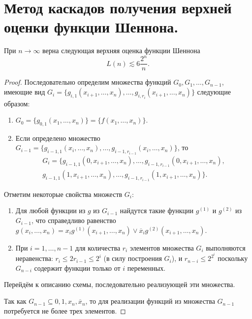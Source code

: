 \section{Метод каскадов получения верхней оценки функции Шеннона.}

\begin{theorem}
    При $n \to \infty$ верна следующая верхняя оценка функции Шеннона
    \[
        L(n) \lesssim 6 \frac{2^n}{n}.
    \]
\end{theorem}

\begin{proof}
    Последовательно определим множества функций $G_0, G_1, \ldots, G_{n-1}$, имеющие вид $G_i = \{g_{i,1}(x_{i+1}, \ldots, x_n), \ldots, g_{i,r_i}(x_{i+1}, \ldots, x_n)\}$ следующие образом:
    \begin{enumerate}[nolistsep]
        \item $G_0 = \{g_{0,1} (x_1, \ldots, x_n)\} = \{f(x_1, \ldots, x_n)\}$.
        \item Если определено множество $G_{i-1} = \{g_{i-1,1}(x_{i}, \ldots, x_n), \ldots, g_{i-1,r_{i-1}}(x_{i}, \ldots, x_n)\}$, то 
        \begin{multline*}
            G_i = \{g_{i-1,1}(0, x_{i+1}, \ldots, x_n), \ldots, g_{i-1,r_{i-1}}(0, x_{i+1}, \ldots, x_n),\\
            g_{i-1,1}(1, x_{i+1}, \ldots, x_n), \ldots, g_{i-1,r_{i-1}}(1, x_{i+1}, \ldots, x_n)\}.
        \end{multline*}
    \end{enumerate}
    Отметим некоторые свойства множеств $G_i$:
    \begin{enumerate}
        \item Для любой функции из $g$ из $G_{i-1}$ найдутся такие функции $g^{(1)}$ и $g^{(2)}$ из $G_{i-1}$, что справедливо равенство $g(x_i, \ldots, x_n) = x_ig^{(1)}(x_{i+1}, \ldots, x_n) \vee \overline{x}_i g^{(2)}(x_{i+1}, \ldots, x_n)$.
        \item При $i=1,\ldots, n-1$ для количества $r_i$ элементов множества $G_i$ выполняются неравенства: $r_i \leqslant 2 r_{i-1} \leqslant 2^i$ (в силу построения $G_i$), и $r_{n-i} \leqslant 2^{2^i}$ поскольку $G_{n-i}$ содержит функции только от $i$ переменных. 
    \end{enumerate}
    Перейдём к описанию схемы, последовательно реализующей эти множества.

    Так как $G_{n-1} \subseteq {0, 1, x_n, \overline{x}_n}$, то для реализации функций из множества $G_{n-1}$ потребуется не более трех элементов.


\end{proof}
